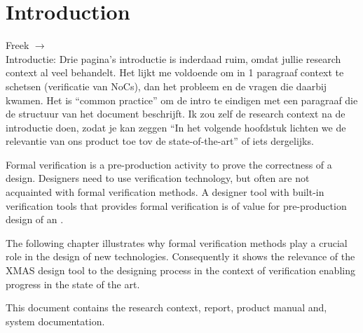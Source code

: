 \chapter*{Introduction}
\begin{tcolorbox}[colback=yellow!30]

Freek $\rightarrow$ \\ 
Introductie: Drie pagina's introductie is inderdaad ruim, omdat jullie research context al veel behandelt. Het lijkt me voldoende om in 1 paragraaf context te schetsen (verificatie van NoCs), dan het probleem en de vragen die daarbij kwamen. Het is ``common practice'' om de intro te eindigen met een paragraaf die de structuur van het document beschrijft. Ik zou zelf de research context na de introductie doen, zodat je kan zeggen ``In het volgende hoofdstuk lichten we de relevantie van ons product toe tov de state-of-the-art'' of iets dergelijks.

\end{tcolorbox}

Formal verification is a pre-production activity to prove the correctness of a 
design. Designers need to use verification technology, but often are not 
acquainted with formal verification methods. A designer tool with built-in 
verification tools that provides formal verification is of value for pre-production
design of an \Noc. 

The following chapter illustrates why formal verification methods play a crucial 
role in the design of new technologies. Consequently it shows the relevance of the
XMAS design tool to the designing process in the context of verification enabling 
progress in the state of the art.

This document contains the research context, report, product manual and, system documentation.



